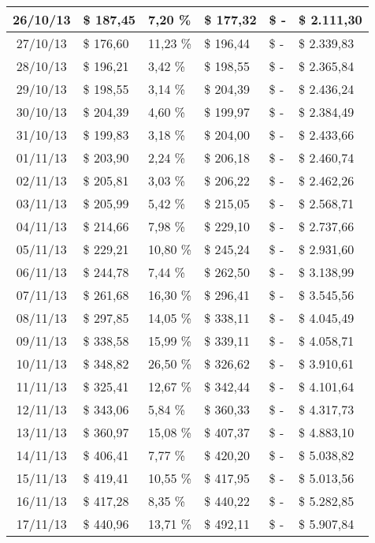 \begin{small}
\begin{longtable}{|c|l|l|l|l|l|}
26/10/13 & \$ 187,45 & 7,20 \% & \$ 177,32 & \$ - & \$ 2.111,30 \\ \hline
27/10/13 & \$ 176,60 & 11,23 \% & \$ 196,44 & \$ - & \$ 2.339,83 \\ \hline
28/10/13 & \$ 196,21 & 3,42 \% & \$ 198,55 & \$ - & \$ 2.365,84 \\ \hline
29/10/13 & \$ 198,55 & 3,14 \% & \$ 204,39 & \$ - & \$ 2.436,24 \\ \hline
30/10/13 & \$ 204,39 & 4,60 \% & \$ 199,97 & \$ - & \$ 2.384,49 \\ \hline
31/10/13 & \$ 199,83 & 3,18 \% & \$ 204,00 & \$ - & \$ 2.433,66 \\ \hline
01/11/13 & \$ 203,90 & 2,24 \% & \$ 206,18 & \$ - & \$ 2.460,74 \\ \hline
02/11/13 & \$ 205,81 & 3,03 \% & \$ 206,22 & \$ - & \$ 2.462,26 \\ \hline
03/11/13 & \$ 205,99 & 5,42 \% & \$ 215,05 & \$ - & \$ 2.568,71 \\ \hline
04/11/13 & \$ 214,66 & 7,98 \% & \$ 229,10 & \$ - & \$ 2.737,66 \\ \hline
05/11/13 & \$ 229,21 & 10,80 \% & \$ 245,24 & \$ - & \$ 2.931,60 \\ \hline
06/11/13 & \$ 244,78 & 7,44 \% & \$ 262,50 & \$ - & \$ 3.138,99 \\ \hline
07/11/13 & \$ 261,68 & 16,30 \% & \$ 296,41 & \$ - & \$ 3.545,56 \\ \hline
08/11/13 & \$ 297,85 & 14,05 \% & \$ 338,11 & \$ - & \$ 4.045,49 \\ \hline
09/11/13 & \$ 338,58 & 15,99 \% & \$ 339,11 & \$ - & \$ 4.058,71 \\ \hline
10/11/13 & \$ 348,82 & 26,50 \% & \$ 326,62 & \$ - & \$ 3.910,61 \\ \hline
11/11/13 & \$ 325,41 & 12,67 \% & \$ 342,44 & \$ - & \$ 4.101,64 \\ \hline
12/11/13 & \$ 343,06 & 5,84 \% & \$ 360,33 & \$ - & \$ 4.317,73 \\ \hline
13/11/13 & \$ 360,97 & 15,08 \% & \$ 407,37 & \$ - & \$ 4.883,10 \\ \hline
14/11/13 & \$ 406,41 & 7,77 \% & \$ 420,20 & \$ - & \$ 5.038,82 \\ \hline
15/11/13 & \$ 419,41 & 10,55 \% & \$ 417,95 & \$ - & \$ 5.013,56 \\ \hline
16/11/13 & \$ 417,28 & 8,35 \% & \$ 440,22 & \$ - & \$ 5.282,85 \\ \hline
17/11/13 & \$ 440,96 & 13,71 \% & \$ 492,11 & \$ - & \$ 5.907,84 \\ \hline

\end{longtable}
\end{small}
